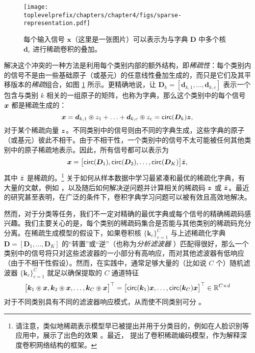 \documentclass[../../book-main.tex]{subfiles}
\begin{document}
\begin{figure}[t]
	\centerline{
\texttt{[image: \\toplevelprefix/chapters/chapter4/figs/sparse-representation.pdf]}}
	\caption{每个输入信号 $\bm x$（这里是一张图片）可以表示为与字典 $\bm D$ 中多个核 $\bm d_c$ 进行稀疏卷积的叠加。}
	\label{fig:multi-channel-sparse-representation}
\end{figure}
解决这个冲突的一种方法是利用每个类别内部的额外结构，即{\em 稀疏性}：每个类别内的信号不是由一些基础原子（或基元）的任意线性叠加生成的，而只是它们及其平移版本的{\em 稀疏}组合，如图 \ref{fig:multi-channel-sparse-representation} 所示。更精确地说，让 $\bm D_k = [\bm d_{k,1}, \ldots, \bm d_{k,c}]$ 表示一个包含与类别 $k$ 相关的一组原子的矩阵，也称为字典，那么这个类别中的每个信号 $\bm{x}$ 都是稀疏生成的：
\begin{equation}
    \bm{x} = \bm d_{k,1} \circledast z_1 + \ldots + \bm d_{k,c} \circledast z_c = \mathsf{circ}(\bm{D}_k)\bm{z},
\end{equation}
对于某个稀疏向量 $\bm{z}$。不同类别中的信号则由不同的字典生成，这些字典的原子（或基元）彼此不相干。由于不相干性，一个类别中的信号不太可能被任何其他类别中的原子稀疏地表示。因此，所有信号都可以表示为
\begin{equation}
\bm{x} = \big[\mathsf{circ}(\bm{D}_1), \mathsf{circ}(\bm{D}_2), \ldots, \mathsf{circ}(\bm{D}_K)\big] \bar {\bm{z}},
\end{equation}
其中 $\bar {\bm{z}}$ 是稀疏的。\footnote{请注意，类似地稀疏表示模型早已被提出并用于分类目的，例如在人脸识别等应用中，展示了出色的效果 \cite{Wright:2009,wagner2012toward}。最近，\cite{papyan2017convolutional} 提出了卷积稀疏编码模型，作为解释深度卷积网络结构的框架。} 关于如何从样本数据中学习最紧凑和最优的稀疏化字典，有大量的文献，例如 \cite{li2019multichannel,qu2019nonconvex}，以及随后如何解决逆问题并计算相关的稀疏码 $\bm{z}$ 或 $\bar {\bm{z}}$。最近 \cite{qu2020nonconvex,Qu2020Geometric} 的研究甚至表明，在广泛的条件下，卷积字典学习问题可以被有效且高效地解决。

然而，对于分类等任务，我们不一定对精确的最优字典或每个信号的精确稀疏码感兴趣。我们主要关心的是，每个类别的稀疏码集合是否能与其他类别的稀疏码充分分离。在稀疏生成模型的假设下，如果卷积核 $\{\bm k_c\}_{c=1}^C$ 与上述稀疏化字典 $\bm D = [\bm D_1, \ldots, \bm D_K]$ 的“转置”或“逆”（也称为{\em 分析滤波器} \cite{Cosparse-Nam,Analysis-Filter}）匹配得很好，那么一个类别中的信号将只对这些滤波器的一小部分有高响应，而对其他滤波器有低响应（由于不相干性假设）。然而，在实践中，通常足够大量的（比如说 $C$ 个）随机滤波器 $\{\bm k_c\}_{c=1}^C$ 就足以确保提取的 $C$ 通道特征
\begin{equation}
\big[\bm k_1 \circledast \bm{x}, \bm k_2 \circledast \bm{x}, \ldots, \bm k_C \circledast \bm{x}\big]^\top = \big[\mathsf{circ}(\bm k_1) \bm{x}, \ldots, \mathsf{circ}(\bm k_C) \bm{x} \big]^\top \in \mathbb{R}^{C\times d}
\end{equation}
对于不同类别具有不同的滤波器响应模式，从而使不同类别可分 \cite{chan2015pcanet}。
\end{document}
